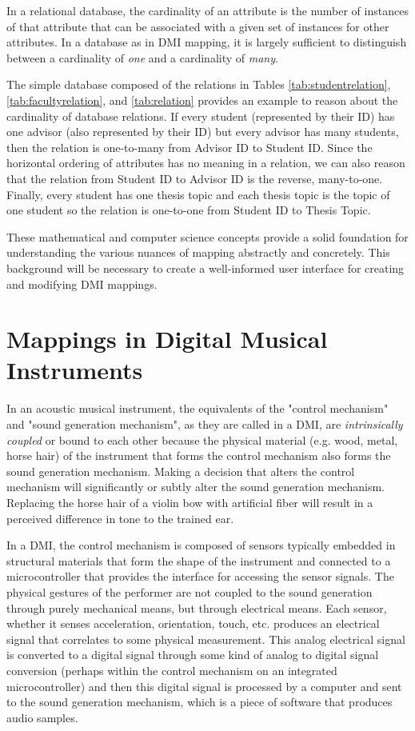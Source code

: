 In a relational database, the cardinality of an attribute is the number of instances of that attribute that can be associated with a given set of instances for other attributes. In a database as in DMI mapping, it is largely sufficient to distinguish between a cardinality of \emph{one} and a cardinality of \emph{many}.

The simple database composed of the relations in Tables \ref{tab:studentrelation}, \ref{tab:facultyrelation}, and \ref{tab:relation} provides an example to reason about the cardinality of database relations. If every student (represented by their ID) has one advisor (also represented by their ID) but every advisor has many students, then the relation is one-to-many from Advisor ID to Student ID. Since the horizontal ordering of attributes has no meaning in a relation, we can also reason that the relation from Student ID to Advisor ID is the reverse, many-to-one. Finally, every student has one thesis topic and each thesis topic is the topic of one student so the relation is one-to-one from Student ID to Thesis Topic.

These mathematical and computer science concepts provide a solid foundation for understanding the various nuances of mapping abstractly and concretely. This background will be necessary to create a well-informed user interface for creating and modifying DMI mappings.

\section{Mappings in Digital Musical Instruments}
\label{sec:Importance of Mapping}

In an acoustic musical instrument, the equivalents of the "control mechanism" and "sound generation mechanism", as they are called in a DMI, are \emph{intrinsically coupled} or bound to each other because the physical material (e.g. wood, metal, horse hair) of the instrument that forms the control mechanism also forms the sound generation mechanism. Making a decision that alters the control mechanism will significantly or subtly alter the sound generation mechanism. Replacing the horse hair of a violin bow with artificial fiber will result in a perceived difference in tone to the trained ear.

In a DMI, the control mechanism is composed of sensors typically embedded in structural materials that form the shape of the instrument and connected to a microcontroller that provides the interface for accessing the sensor signals. The physical gestures of the performer are not coupled to the sound generation through purely mechanical means, but through electrical means. Each sensor, whether it senses acceleration, orientation, touch, etc. produces an electrical signal that correlates to some physical measurement. This analog electrical signal is converted to a digital signal through some kind of analog to digital signal conversion (perhaps within the control mechanism on an integrated microcontroller) and then this digital signal is processed by a computer and sent to the sound generation mechanism, which is a piece of software that produces audio samples.

